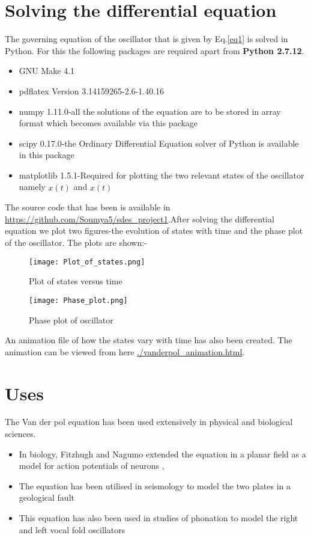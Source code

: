\documentclass[a4paper]{article}
\begin{document}
\section{Solving the differential equation}
The governing equation of the oscillator that is given by Eq.\ref{eq1} is solved in Python. For this the following packages are required 
apart from \textbf{Python 2.7.12}.
\begin{itemize}
    \item{GNU Make 4.1}
    \item{pdflatex Version 3.14159265-2.6-1.40.16} 
    \item{numpy 1.11.0}-all the solutions of the equation are to be stored in array format which becomes available via this package
    \item{scipy 0.17.0}-the Ordinary Differential Equation solver of Python is available in this package
    \item{matplotlib 1.5.1}-Required for plotting the two relevant states of the oscillator namely $x(t)$ and $\dot{x(t)}$
\end{itemize}
The source code that has been is available in \url{https://github.com/Soumya5/sdes_project1}.After solving the differential equation we plot two figures-the evolution of states with time and the phase plot of the oscillator. The plots are shown:-
\begin{figure}[H]
    \centering
    \texttt{[image: Plot\_of\_states.png]}
    \caption{Plot of states versus time}
\end{figure}
\begin{figure}[H]
    \centering
    \texttt{[image: Phase\_plot.png]}
    \caption{Phase plot of oscillator}
\end{figure}
An animation file of how the states vary with time has also been created. The animation can be viewed from here \url{./vanderpol_animation.html}.
\section{Uses}
The Van der pol equation has been used extensively in physical and biological sciences.
\begin{itemize}
    \item In biology, Fitzhugh and Nagumo extended the equation in a planar field as a model for action potentials of neurons \cite{fitz}, \cite{nagumo1962}
    \item The equation has been utilised in seismology to model the two plates in a geological fault \cite{seis}
    \item This equation has also been used in studies of phonation to model the right and left vocal fold oscillators \cite{phonation}
\end{itemize}
{}

\end{document}
